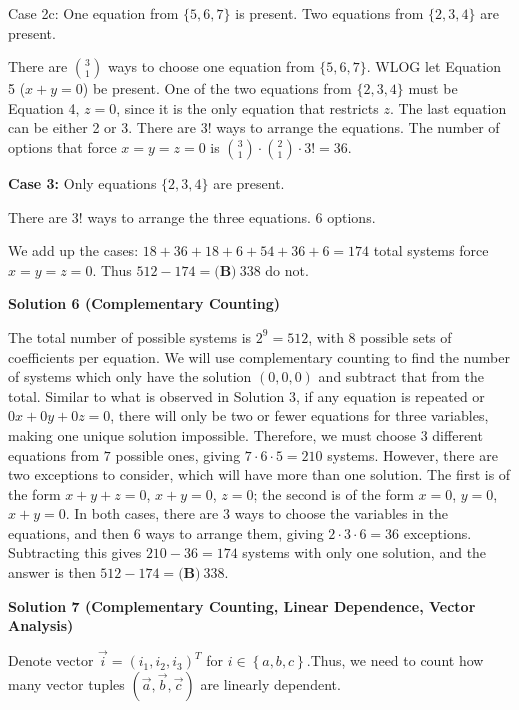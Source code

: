\begin{enumerate}
 Case 2c: One equation from $\{5, 6, 7\}$ is present. Two equations from $\{2, 3, 4\}$ are present.

 There are $\binom{3}{1}$ ways to choose one equation from $\{5, 6, 7\}$. WLOG let Equation 5 ($x + y = 0$) be present. One of the two equations from $\{2, 3, 4\}$ must be Equation 4, $z = 0$, since it is the only equation that restricts $z$. The last equation can be either 2 or 3. There are $3!$ ways to arrange the equations. The number of options that force $x = y = z = 0$ is $\binom{3}{1} \cdot \binom{2}{1} \cdot 3! = 36$.

 \textbf{Case 3:} Only equations $\{2, 3, 4\}$ are present.

 There are $3!$ ways to arrange the three equations. $6$ options.

 We add up the cases: $18 + 36 + 18 + 6 + 54 + 36 + 6 = 174$ total systems force $x = y = z = 0$. Thus $512 - 174 = \boxed{\textbf{(B)}\ 338}$ do not.

 



\textbf{Solution 6 (Complementary Counting)}

The total number of possible systems is $2^9 = 512$, with $8$ possible sets of coefficients per equation. We will use complementary counting to find the number of systems which only have the solution $(0, 0, 0)$ and subtract that from the total. Similar to what is observed in Solution 3, if any equation is repeated or $0x + 0y + 0z = 0$, there will only be two or fewer equations for three variables, making one unique solution impossible. Therefore, we must choose $3$ different equations from $7$ possible ones, giving $7 \cdot 6 \cdot 5 = 210$ systems. However, there are two exceptions to consider, which will have more than one solution. The first is of the form $x + y + z = 0$, $x + y = 0$, $z = 0$; the second is of the form $x = 0$, $y = 0$, $x + y = 0$. In both cases, there are $3$ ways to choose the variables in the equations, and then $6$ ways to arrange them, giving $2 \cdot 3 \cdot 6 = 36$ exceptions. Subtracting this gives $210 - 36 = 174$ systems with only one solution, and the answer is then $512 - 174 = \boxed{\textbf{(B)}\ 338}$. 

 



\textbf{Solution 7 (Complementary Counting, Linear Dependence, Vector Analysis)}

Denote vector $\overrightarrow{i} = \left( i_1, i_2, i_3 \right)^T$ for $i \in \left\{ a, b, c \right\}$.Thus, we need to count how many vector tuples $\left( \overrightarrow{a} , \overrightarrow{b} , \overrightarrow{c} \right)$ are linearly dependent.


\end{enumerate}

